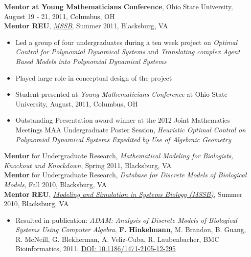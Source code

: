 \documentclass[10pt]{article}
\begin{document}
\textbf{Mentor at Young Mathematicians Conference}, Ohio State University, August 19 - 21, 2011, Columbus, OH\\
	
\textbf{Mentor REU},
  \href{http://biomath.vbi.vt.edu/}{\textit{MSSB}}, Summer 2011, Blacksburg, VA
	\begin{itemize}
	    \item Led a group of four undergraduates during a ten week project on {\it Optimal Control for Polynomial Dynamical Systems} and {\it Translating complex Agent Based Models into Polynomial Dynamical Systems}
		\item Played large role in conceptual design of the project
		\item Student presented at {\it Young Mathematicians Conference} at Ohio State University, August, 2011, Columbus, OH
		\item Outstanding Presentation award winner at the 2012 Joint Mathematics Meetings MAA
		Undergraduate Poster Session, {\it Heuristic Optimal Control on
		Polynomial Dynamical Systems Expedited by Use of Algebraic Geometry} \\
	  \end{itemize}
	
 \textbf{Mentor} for Undergraduate Research, \textit{Mathematical Modeling
  for Biologists, Knockout and Knockdown}, Spring 2011, Blacksburg, VA \\

\textbf{Mentor} for Undergraduate Research, \textit{Database for Discrete Models of Biological Models}, Fall 2010, Blacksburg, VA\\


	\textbf{Mentor} {\bf REU}, \href{http://biomath.vbi.vt.edu/}{\textit{Modeling and Simulation in Systems Biology (MSSB)}}, Summer 2010, Blacksburg, VA
  \begin{itemize}

    \item Resulted in publication: \textit{ADAM: Analysis of Discrete Models of Biological Systems Using Computer
	Algebra}, {\bf F. Hinkelmann}, M. Brandon, B. Guang, R. McNeill,
	G. Blekherman, A. Veliz-Cuba, R. Laubenbacher, BMC Bioinformatics, 2011, \href{http://dx.doi.org/10.1186/1471-2105-12-295}{DOI: 10.1186/1471-2105-12-295}
  \end{itemize}
\end{document}
